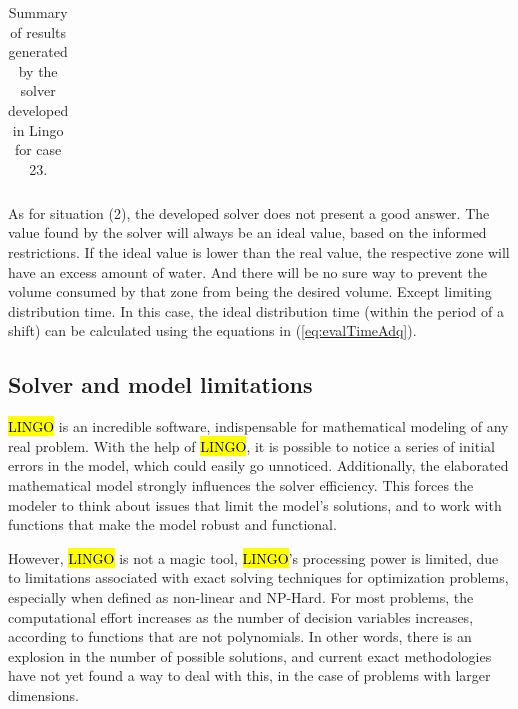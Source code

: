 \documentclass{singlecol}
\theoremstyle{TH}{
\newtheorem{lemma}{Lemma}
\newtheorem{theorem}[lemma]{Theorem}
\newtheorem{corrolary}[lemma]{Corrolary}
\newtheorem{conjecture}[lemma]{Conjecture}
\newtheorem{proposition}[lemma]{Proposition}
\newtheorem{claim}[lemma]{Claim}
\newtheorem{stheorem}[lemma]{Wrong Theorem}
\newtheorem{algorithm}{Algorithm}
}
\theoremstyle{THrm}{
\newtheorem{definition}{Definition}[section]
\newtheorem{question}{Question}[section]
\newtheorem{remark}{Remark}
\newtheorem{scheme}{Scheme}
}
\theoremstyle{THhit}{
\newtheorem{case}{Case}[section]
}
\begin{document}
\begin{table}[h!]
\begin{center}
\begin{small}
\begin{tabular}{ c r r r r r }
	\end{tabular}
\caption{Summary of results generated by the solver developed in Lingo for case 23.}
\label{tab:lingoEvaluationsCase23}
\end{small}
\end{center}
\end{table}

As for situation (2), the developed solver does not present a good answer. The value found by the solver will always be an ideal value, based on the informed restrictions. If the ideal value is lower than the real value, the respective zone will have an excess amount of water. And there will be no sure way to prevent the volume consumed by that zone from being the desired volume. Except limiting distribution time. In this case, the ideal distribution time (within the period of a shift) can be calculated using the equations in (\ref{eq:evalTimeAdq}). 

\subsection{Solver and model limitations}
\label{sec:limitations}

\hl{LINGO} is an incredible software, indispensable for mathematical modeling of any real problem. With the help of \hl{LINGO}, it is possible to notice a series of initial errors in the model, which could easily go unnoticed. Additionally, the elaborated mathematical model strongly influences the solver efficiency. This forces the modeler to think about issues that limit the model's solutions, and to work with functions that make the model robust and functional.

However, \hl{LINGO} is not a magic tool, \hl{LINGO}'s processing power is limited, due to limitations associated with exact solving techniques for optimization problems, especially when defined as non-linear and NP-Hard. For most problems, the computational effort increases as the number of decision variables increases, according to functions that are not polynomials. In other words, there is an explosion in the number of possible solutions, and current exact methodologies have not yet found a way to deal with this, in the case of problems with larger dimensions. 
\end{document}

